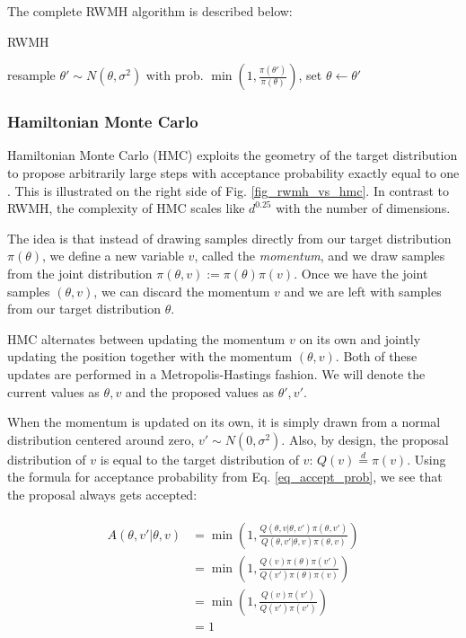 \documentclass[12pt]{article}
\begin{document}
{The complete RWMH algorithm is described below:
\begin{algorithm}
\caption{RWMH}
\label{alg_rwmh}
\begin{algorithmic}
 
	\State resample $\theta' \sim N(\theta, \sigma^2)$ 
	\State with prob. $\min{(1, \frac{\pi(\theta')}{\pi(\theta)})}$, set $\theta \gets \theta'$ 
\EndFor
\end{algorithmic}
\end{algorithm}

\subsubsection{Hamiltonian Monte Carlo}

Hamiltonian Monte Carlo (HMC) exploits the geometry of the target distribution to propose arbitrarily large steps with acceptance probability exactly equal to one \cite{hmc}. This is illustrated on the right side of Fig. \ref{fig_rwmh_vs_hmc}. In contrast to RWMH, the complexity of HMC scales like $d^{0.25}$ with the number of dimensions.

The idea is that instead of drawing samples directly from our target distribution $\pi(\theta)$, we define a new variable $v$, called the \textit{momentum}, and we draw samples from the joint distribution $\pi(\theta, v) := \pi(\theta)\pi(v)$. Once we have the joint samples $(\theta, v)$, we can discard the momentum $v$ and we are left with samples from our target distribution $\theta$.

HMC alternates between updating the momentum $v$ on its own and jointly updating the position together with the momentum $(\theta, v)$. Both of these updates are performed in a Metropolis-Hastings fashion. We will denote the current values as $\theta, v$ and the proposed values as $\theta', v'$.

When the momentum is updated on its own, it is simply drawn from a normal distribution centered around zero, $v' \sim N(0, \sigma^2)$. Also, by design, the proposal distribution of $v$ is equal to the target distribution of $v$: $Q(v) \overset{d}{=} \pi(v)$. Using the formula for acceptance probability from Eq. \ref{eq_accept_prob}, we see that the proposal always gets accepted:

\begin{align}
\begin{split}
A(\theta,v'|\theta,v) &= \min \left(1, \frac{Q(\theta,v|\theta,v')\pi(\theta,v')}{Q(\theta,v'|\theta,v)\pi(\theta,v)} \right) \\
&= \min \left(1, \frac{Q(v)\pi(\theta)\pi(v')}{Q(v')\pi(\theta)\pi(v)} \right) \\
&= \min \left(1, \frac{Q(v)\pi(v')}{Q(v')\pi(v')} \right) \\
&= 1
\end{split}
\end{align}

}
\end{document}
